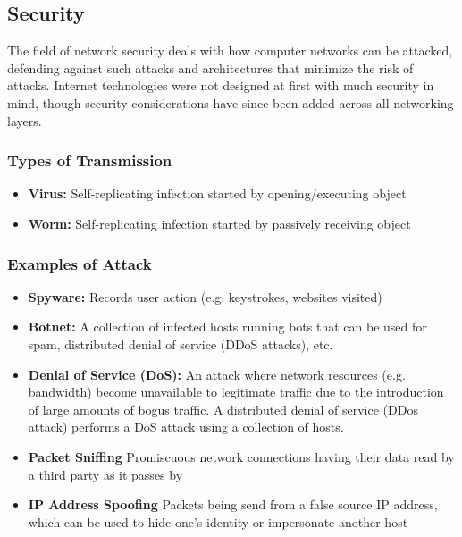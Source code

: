 \documentclass[12pt,titlepage]{article}
\begin{document}
      \subsection{Security}
        The field of network security deals with how computer networks can be attacked, defending against such attacks and architectures
        that minimize the risk of attacks. Internet technologies were not designed at first with much security in mind, though security
        considerations have since been added across all networking layers.

      \subsubsection{Types of Transmission}
        \begin{itemize}
          \item \textbf{Virus:} Self-replicating infection started by opening/executing object
          \item \textbf{Worm:} Self-replicating infection started by passively receiving object
        \end{itemize}

      \subsubsection{Examples of Attack}
        \begin{itemize}
          \item \textbf{Spyware:} Records user action (e.g. keystrokes, websites visited)
          \item \textbf{Botnet:} A collection of infected hosts running bots that can be used for spam, distributed denial of service (DDoS attacks), etc.
          \item \textbf{Denial of Service (DoS):} An attack where network resources (e.g. bandwidth) become unavailable to legitimate traffic due to the
          introduction of large amounts of bogus traffic. A distributed denial of service (DDos attack) performs a DoS attack using a collection of hosts.
          \item \textbf{Packet Sniffing} Promiscuous network connections having their data read by a third party as it passes by
          \item \textbf{IP Address Spoofing} Packets being send from a false source IP address, which can be used to hide one's identity or impersonate another host
        \end{itemize}
\end{document}
